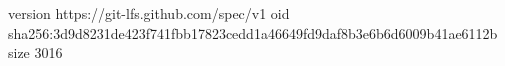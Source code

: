 version https://git-lfs.github.com/spec/v1
oid sha256:3d9d8231de423f741fbb17823cedd1a46649fd9daf8b3e6b6d6009b41ae6112b
size 3016
